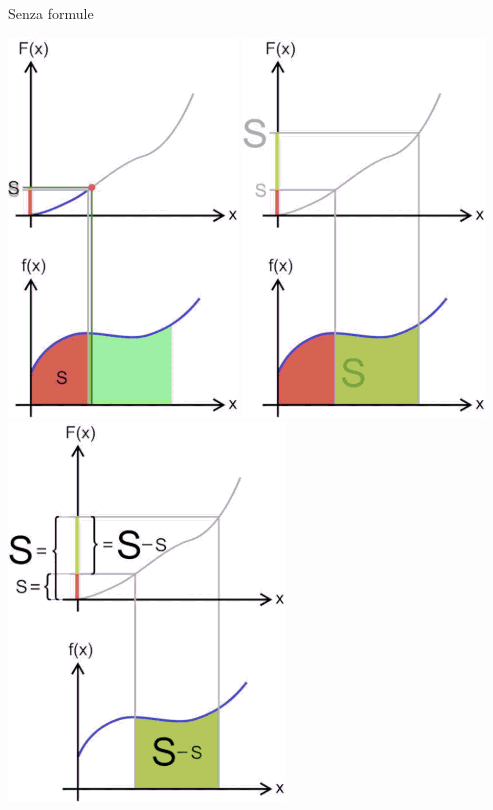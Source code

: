\documentclass[8pt]{beamer}
\begin{document}
\begin{frame}{Senza formule}
\begin{center}
    \includegraphics[scale=.2]{Z-287.png}
    \includegraphics[scale=.2]{Z-323.png}
    \includegraphics[scale=.2]{Z-418.png}

\end{center}
\end{frame}
\end{document}
